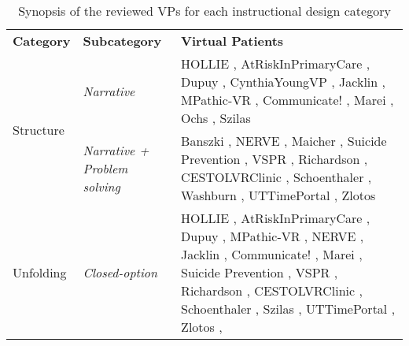 
\begin{table} [t]
\scriptsize{
\begin{center}
    \caption{Synopsis of the reviewed VPs for each instructional design category}
    \label{table:instructionalDesignTable}
    \begin{tabular}{| p{1.8cm} | p{2cm} | p{8cm} |}
    \hline
        \rowcolor{mygray}
        \multicolumn{3}{|c|}{\textbf{Instructional design}}\\
    \hline
        \rowcolor{lightgray}
        \textbf{Category}  & \textbf{Subcategory} & \textbf{Virtual Patients}\\
    \hline
         \multirow{2}{*}{Structure} & \emph{Narrative} & HOLLIE \cite{adefila2020students}, AtRiskInPrimaryCare \cite{albright2018using}, Dupuy \cite{dupuy2019virtual}, CynthiaYoungVP \cite{foster2016using}, Jacklin \cite{jacklin2019virtual,jacklin2018improving}, MPathic-VR \cite{guetterman2019medical,kron2017using}, Communicate! \cite{jeuring2015communicate}, Marei \cite{marei2018use},  Ochs \cite{ochs2019training}, Szilas \cite{szilas2019virtual} \\
    \cline{2-3}
        & \emph{Narrative + Problem solving} & Banszki \cite{banszki2018clinical,quail2016student}, NERVE
        \cite{hirumi2016advancingPart2,hirumi2016advancing,kleinsmith2015understanding},  Maicher \cite{maicher2017developing}, Suicide Prevention \cite{o2019suicide}, VSPR \cite{peddle2019exploring,peddle2019development}, Richardson \cite{richardson2019virtual}, CESTOLVRClinic \cite{sapkaroski2018implementation}, Schoenthaler \cite{schoenthaler2017simulated},   Washburn \cite{washburn2020virtual},  UTTimePortal \cite{zielke2016beyond,zielke2016using}, Zlotos \cite{zlotos2016scenario}\\
    \hline
         \multirow{3}{*}{Unfolding} & \emph{Closed-option} & HOLLIE \cite{adefila2020students}, AtRiskInPrimaryCare \cite{albright2018using}, Dupuy \cite{dupuy2019virtual}, MPathic-VR \cite{guetterman2019medical,kron2017using}, NERVE
        \cite{hirumi2016advancingPart2,hirumi2016advancing,kleinsmith2015understanding}, Jacklin \cite{jacklin2019virtual,jacklin2018improving}, Communicate! \cite{jeuring2015communicate}, Marei \cite{marei2018use}, Suicide Prevention \cite{o2019suicide}, VSPR \cite{peddle2019exploring,peddle2019development}, Richardson \cite{richardson2019virtual}, CESTOLVRClinic \cite{sapkaroski2018implementation}, Schoenthaler \cite{schoenthaler2017simulated}, Szilas \cite{szilas2019virtual}, UTTimePortal \cite{zielke2016beyond,zielke2016using}, Zlotos \cite{zlotos2016scenario}, \\

\end{tabular}
\end{center}}
\end{table}
